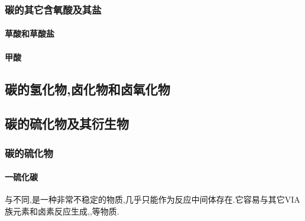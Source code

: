\documentclass[draft]{ctexart}
\begin{document}
\subsubsection{碳的其它含氧酸及其盐}
\paragraph{草酸和草酸盐}
\paragraph{甲酸}
\subsection{碳的氢化物,卤化物和卤氧化物}
\subsection{碳的硫化物及其衍生物}
\subsubsection{碳的硫化物}
\paragraph{一硫化碳}
与不同,是一种非常不稳定的物质,几乎只能作为反应中间体存在.它容易与其它VIA族元素和卤素反应生成,,等物质.
\paragraph{}
\end{document}
